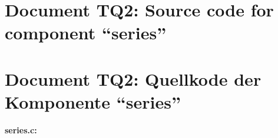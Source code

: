 \pagestyle{myheadings}
\ifenglish
{}
\fi
\ifgerman
{}
\fi
\parindent0pt


\ifenglish
\section*{Document TQ2: Source code for component ``series''}
\fi
\ifgerman
\section*{Document TQ2: Quellkode der Komponente "`series"'}
\fi

{\bf series.c:}
\smallskip




